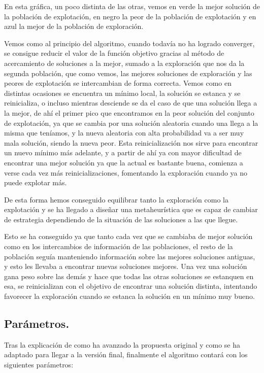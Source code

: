 \documentclass[12pt, spanish]{article}
\begin{document}
En esta gráfica, un poco distinta de las otras, vemos en verde la mejor solución de la población de explotación, en negro la peor de la población de explotación y en azul la mejor de la población de exploración.

Vemos como al principio del algoritmo, cuando todavía no ha logrado converger, se consigue reducir el valor de la función objetivo gracias al método de acercamiento de soluciones a la mejor, sumado a la exploración que nos da la segunda población, que como vemos, las mejores soluciones de exploración y las peores de explotación se intercambian de forma correcta. Vemos como en distintas ocasiones se encuentra un mínimo local, la solución se estanca y se reinicializa, o incluso mientras desciende se da el caso de que una solución llega a la mejor, de ahí el primer pico que encontramos en la peor solución del conjunto de explotación, ya que se cambia por una solución aleatoria cuando una llega a la misma que teníamos, y la nueva aleatoria con alta probabilidad va a ser muy mala solución, siendo la nueva peor. Esta reinicialización nos sirve para encontrar un nuevo mínimo más adelante, y a partir de ahí ya con mayor dificultad de encontrar una mejor solución ya que la actual es bastante buena, comienza a verse cada vez más reinicializaciones, fomentando la exploración cuando ya no puede explotar más.

De esta forma hemos conseguido equilibrar tanto la exploración como la explotación y se ha llegado a diseñar una metaheurística que es capaz de cambiar de estrategia dependiendo de la situación de las soluciones a las que llegue.

Esto se ha conseguido ya que tanto cada vez que se cambiaba de mejor solución como en los intercambios de información de las poblaciones, el resto de la población seguía manteniendo información sobre las mejores soluciones antiguas, y esto les llevaba a encontrar nuevas soluciones mejores. Una vez una solución gana peso sobre las demás y hace que todas las otras soluciones se estanquen en esa, se reinicializan con el objetivo de encontrar una solución distinta, intentando favorecer la exploración cuando se estanca la solución en un mínimo muy bueno.


\subsection{Parámetros.}

Tras la explicación de como ha avanzado la propuesta original y como se ha adaptado para llegar a la versión final, finalmente el algoritmo contará con los siguientes parámetros:
\end{document}
